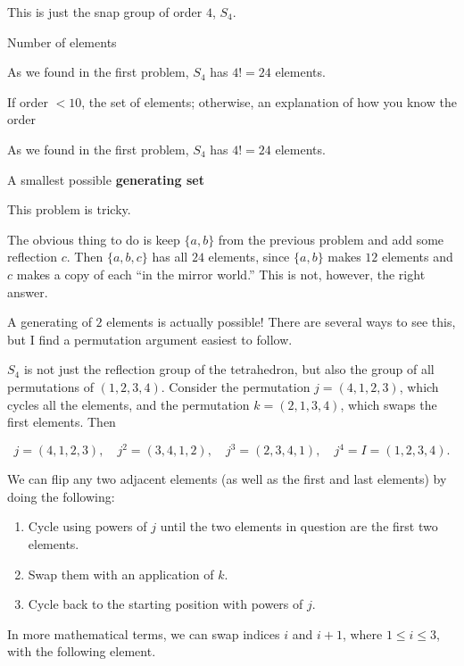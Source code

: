 \documentclass[../key.tex]{subfiles}
\begin{document}
\noindent This is just the snap group of order $4$, $S_4$.

\begin{inner_problem}[start=1]
\item Number of elements
\end{inner_problem}

\noindent As we found in the first problem, $S_4$ has $4!=24$ elements.

\begin{inner_problem}
\item If order $< 10$, the set of elements; otherwise, an explanation of how you know the order
\end{inner_problem}

\noindent As we found in the first problem, $S_4$ has $4!=24$ elements.

\begin{inner_problem}
\item A smallest possible \textbf{generating set}
\end{inner_problem}

\noindent This problem is tricky.

The obvious thing to do is keep $\{a,b\}$ from the previous problem and add some reflection $c$. Then $\{a,b,c\}$ has all $24$ elements, since $\{a,b\}$ makes $12$ elements and $c$ makes a copy of each ``in the mirror world.'' This is not, however, the right answer.

A generating of $2$ elements is actually possible! There are several ways to see this, but I find a permutation argument easiest to follow.

$S_4$ is not just the reflection group of the tetrahedron, but also the group of all permutations of $(1,2,3,4)$. Consider the permutation $j=(4,1,2,3)$, which cycles all the elements, and the permutation $k=(2,1,3,4)$, which swaps the first elements. Then

$$j=(4,1,2,3),\quad j^2=(3,4,1,2),\quad j^3=(2,3,4,1),\quad j^4=I=(1,2,3,4).$$

\noindent We can flip any two adjacent elements (as well as the first and last elements) by doing the following:
\begin{enumerate}
\item Cycle using powers of $j$ until the two elements in question are the first two elements.
\item Swap them with an application of $k$.
\item Cycle back to the starting position with powers of $j$.
\end{enumerate}
In more mathematical terms, we can swap indices $i$ and $i+1$, where $1\leq i \leq 3$, with the following element.
\end{document}
